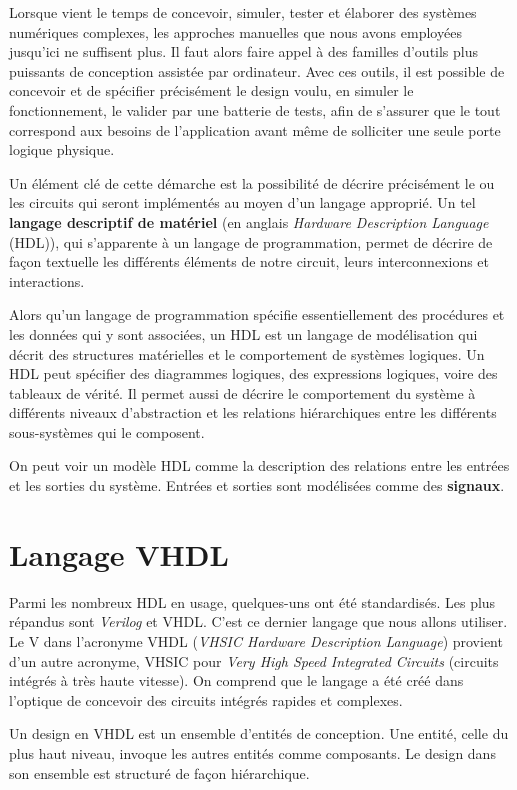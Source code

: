 \documentclass[letter, oneside]{book}
\begin{document}
Lorsque vient le temps de concevoir, simuler, tester et élaborer des
systèmes numériques complexes, les approches manuelles que nous avons
employées jusqu'ici ne suffisent plus. Il faut alors faire appel à des
familles d'outils plus puissants de conception assistée par
ordinateur. Avec ces outils, il est possible de concevoir et de
spécifier précisément le design voulu, en simuler le fonctionnement,
le valider par une batterie de tests, afin de s'assurer que le tout
correspond aux besoins de l'application avant même de solliciter une
seule porte logique physique.

Un élément clé de cette démarche est la possibilité de décrire
précisément le ou les circuits qui seront implémentés au moyen d'un
langage approprié. Un tel \textbf{langage descriptif de matériel} (en anglais
\emph{Hardware Description Language} (HDL)), qui s'apparente à un langage
de programmation, permet de décrire de façon textuelle les différents
éléments de notre circuit, leurs interconnexions et interactions.

Alors qu'un langage de programmation spécifie essentiellement des
procédures et les données qui y sont associées, un HDL est un langage
de modélisation qui décrit des structures matérielles et le
comportement de systèmes logiques. Un HDL peut spécifier des
diagrammes logiques, des expressions logiques, voire des tableaux de
vérité. Il permet aussi de décrire le comportement du système à
différents niveaux d'abstraction et les relations hiérarchiques entre
les différents sous-systèmes qui le composent.

On peut voir un modèle HDL comme la description des relations entre
les entrées et les sorties du système. Entrées et sorties sont
modélisées comme des \textbf{signaux}.

\section{Langage VHDL}
\label{sec:orgea490b1}

Parmi les nombreux HDL en usage, quelques-uns ont été
standardisés. Les plus répandus sont \emph{Verilog} et VHDL. C'est ce
dernier langage que nous allons utiliser.  Le V dans l'acronyme VHDL
(\emph{VHSIC Hardware Description Language}) provient d'un autre acronyme,
VHSIC pour \emph{Very High Speed Integrated Circuits} (circuits intégrés à
très haute vitesse). On comprend que le langage a été créé dans
l'optique de concevoir des circuits intégrés rapides et complexes.

Un design en VHDL est un ensemble d'entités de conception. Une entité,
celle du plus haut niveau, invoque les autres entités comme
composants.  Le design dans son ensemble est structuré de façon
hiérarchique.
\end{document}
